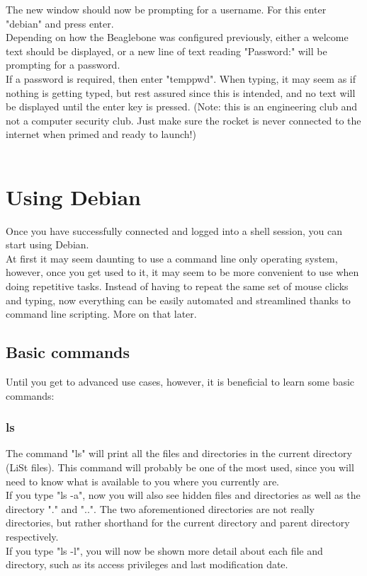 \documentclass[12pt,article]{memoir}
\begin{document}
\noindent
The new window should now be prompting for a username. For this enter "debian" and press enter.\\

\noindent
Depending on how the Beaglebone was configured previously, either a welcome text should be displayed, or a new line of text reading "Password:" will be prompting for a password.\\
If a password is required, then enter "temppwd". When typing, it may seem as if nothing is getting typed, but rest assured since this is intended, and no text will be displayed until the enter key is pressed. (Note: this is an engineering club and not a computer security club. Just make sure the rocket is never connected to the internet when primed and ready to launch!)\\\\



\newpage
\section{Using Debian}
Once you have successfully connected and logged into a shell session, you can start using Debian.\\

\noindent
At first it may seem daunting to use a command line only operating system, however, once you get used to it, it may seem to be more convenient to use when doing repetitive tasks. Instead of having to repeat the same set of mouse clicks and typing, now everything can be easily automated and streamlined thanks to command line scripting. More on that later.\\

\subsection{Basic commands}
Until you get to advanced use cases, however, it is beneficial to learn some basic commands:\\

\subsubsection{ls}
The command "ls" will print all the files and directories in the current directory (LiSt files). This command will probably be one of the most used, since you will need to know what is available to you where you currently are.\\
\noindent
If you type "ls -a", now you will also see hidden files and directories as well as the directory "." and "..". The two aforementioned directories are not really directories, but rather shorthand for the current directory and parent directory respectively.\\
\noindent
If you type "ls -l", you will now be shown more detail about each file and directory, such as its access privileges and last modification date.\\
\end{document}
